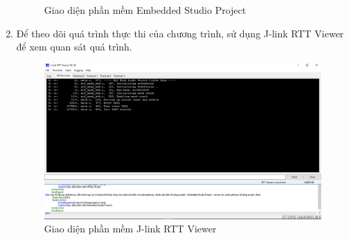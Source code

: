 \begin{enumerate}
\begin{figure}[h!]
\begin{center}
    		\caption{Giao diện phần mềm Embedded Studio Project}
    	\end{center}
    	\end{figure}
    	\newpage
\item Để theo dõi quá trình thực thi của chương trình, sử dụng J-link RTT Viewer để xem quan sát quá trình.
	 \begin{figure}[h!]
    	 \begin{center}
    		\includegraphics[scale=0.4]{images/app3-3.png}
    		\caption{Giao diện phần mềm J-link RTT Viewer}
    	\end{center}
    	\end{figure}
\end{enumerate}